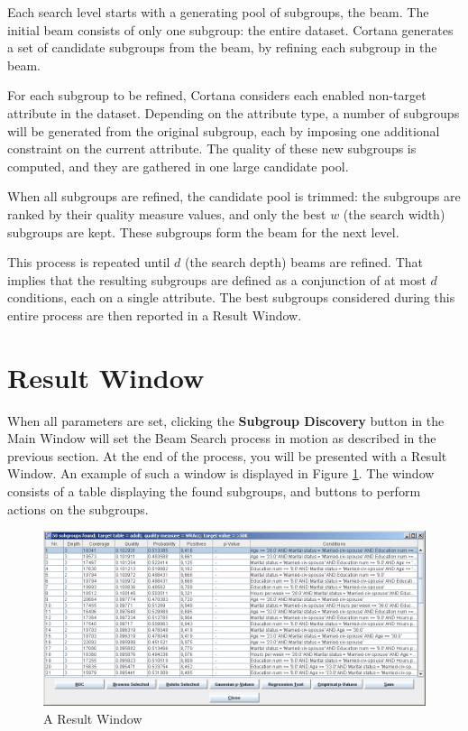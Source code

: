 \documentclass{article}
\begin{document}
Each search level starts with a generating pool of subgroups, the
\gls{beam}.  The initial beam consists of only one subgroup: the entire
dataset.  Cortana generates a set of candidate subgroups from the beam, by
refining each subgroup in the beam.

For each subgroup to be refined, Cortana considers each \gls{enabled}
non-target attribute in the dataset.  Depending on the attribute type, a
number of subgroups will be generated from the original subgroup, each by
imposing one additional constraint on the current attribute.  The quality of
these new subgroups is computed, and they are gathered in one large
candidate pool.

When all subgroups are refined, the candidate pool is trimmed: the subgroups
are ranked by their quality measure values, and only the best $w$ (the
\gls{search width}) subgroups are kept. These subgroups form the \gls{beam}
for the next level.

This process is repeated until $d$ (the \gls{search depth}) beams are
refined.  That implies that the resulting subgroups are defined as a
conjunction of at most $d$ conditions, each on a single attribute.  The best
subgroups considered during this entire process are then reported in a
Result Window.

\section{Result Window}
\label{section:result-window}

When all parameters are set, clicking the \textbf{Subgroup Discovery} button
in the Main Window will set the Beam Search process in motion as described
in the previous section. At the end of the process, you will be presented
with a Result Window. An example of such a window is displayed in Figure
\ref{fig:resultwindow}. The window consists of a table displaying the found
subgroups, and buttons to perform actions on the subgroups.

\begin{figure}[t]
\begin{center}
\includegraphics[width=\textwidth]{resultwindow_r1011.png}
\caption{A Result Window}
\label{fig:resultwindow}
\end{center}
\end{figure}
\end{document}
